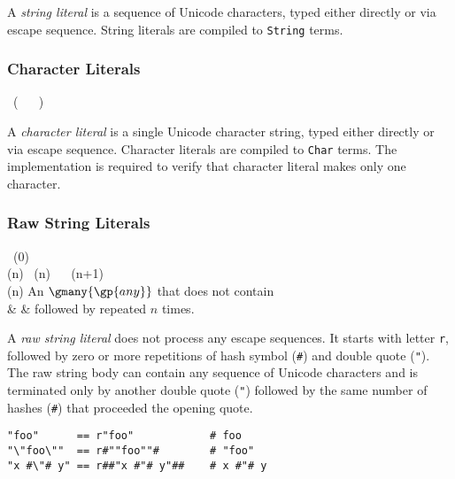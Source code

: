 A \emph{string literal} is a sequence of Unicode characters, typed either directly or via escape sequence. String literals are compiled to \lstinline{String} terms.

\subsubsection*{Character Literals}

\begin{bnf}
   \eq {} \ ( \  \gor {} \ ) \ 
\end{bnf}

A \emph{character literal} is a single Unicode character string, typed either directly or via escape sequence. Character literals are compiled to \lstinline{Char} terms. The implementation is required to verify that character literal makes only one character.

\subsubsection*{Raw String Literals}

\begin{bnf}
        \eq {} \ (0) \\
  (n)  \eq    {} \ (n) \ 
                      \gorln \term{\#} \ (n+1) \ \term{\#} \\
  (n) \eq \textnormal{An \(\gmany{\gp{any}}\) that does not contain} \\
                      & & \textnormal{ followed by \term{\#} repeated \(n\) times.}
\end{bnf}

A \emph{raw string literal} does not process any escape sequences. It starts with letter \texttt{r}, followed by zero or more repetitions of hash symbol (\texttt{\#}) and double quote (\texttt{"}). The raw string body can contain any sequence of Unicode characters and is terminated only by another double quote (\texttt{"}) followed by the same number of hashes (\texttt{\#}) that proceeded the opening quote.

\begin{example}
\begin{lstlisting}
"foo"      == r"foo"            # foo
"\"foo\""  == r#""foo""#        # "foo"
"x #\"# y" == r##"x #"# y"##    # x #"# y
\end{lstlisting}
\end{example}

